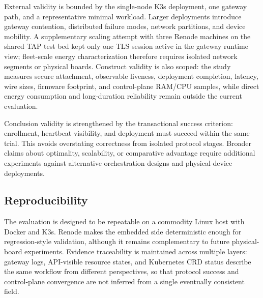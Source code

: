 External validity is bounded by the single-node K3s deployment, one gateway path, and a representative minimal workload. Larger deployments introduce gateway contention, distributed failure modes, network partitions, and device mobility. A supplementary scaling attempt with three Renode machines on the shared TAP test bed kept only one TLS session active in the gateway runtime view; fleet-scale energy characterization therefore requires isolated network segments or physical boards. Construct validity is also scoped: the study measures secure attachment, observable liveness, deployment completion, latency, wire sizes, firmware footprint, and control-plane RAM/CPU samples, while direct energy consumption and long-duration reliability remain outside the current evaluation.

Conclusion validity is strengthened by the transactional success criterion: enrollment, heartbeat visibility, and deployment must succeed within the same trial. This avoids overstating correctness from isolated protocol stages. Broader claims about optimality, scalability, or comparative advantage require additional experiments against alternative orchestration designs and physical-device deployments.

\subsection{Reproducibility}
The evaluation is designed to be repeatable on a commodity Linux host with Docker and K3s. Renode makes the embedded side deterministic enough for regression-style validation, although it remains complementary to future physical-board experiments. Evidence traceability is maintained across multiple layers: gateway logs, API-visible resource states, and Kubernetes CRD status describe the same workflow from different perspectives, so that protocol success and control-plane convergence are not inferred from a single eventually consistent field.
